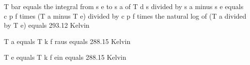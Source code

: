 T bar equals the integral from s e to s a of T d s divided by s a minus s e equals c p f times (T a minus T e) divided by c p f times the natural log of (T a divided by T e) equals 293.12 Kelvin

T a equals T k f raus equals 288.15 Kelvin

T e equals T k f ein equals 288.15 Kelvin
